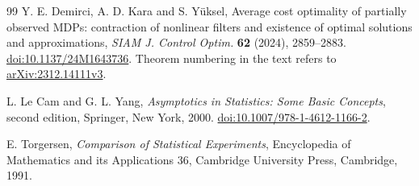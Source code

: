 \begin{thebibliography}{99}
Y. E. Demirci, A. D. Kara and S. Y\"uksel, Average cost optimality of
partially observed MDPs: contraction of nonlinear filters and existence
of optimal solutions and approximations,
\emph{SIAM J. Control Optim.} \textbf{62} (2024), 2859--2883.
\href{https://doi.org/10.1137/24M1643736}{doi:10.1137/24M1643736}.
Theorem numbering in the text refers to
\href{https://arxiv.org/abs/2312.14111v3}{arXiv:2312.14111v3}.

L. Le Cam and G. L. Yang, \emph{Asymptotics in Statistics: Some Basic
Concepts}, second edition, Springer, New York, 2000.
\href{https://doi.org/10.1007/978-1-4612-1166-2}{doi:10.1007/978-1-4612-1166-2}.

E. Torgersen, \emph{Comparison of Statistical Experiments},
Encyclopedia of Mathematics and its Applications 36,
Cambridge University Press, Cambridge, 1991.

\end{thebibliography}
